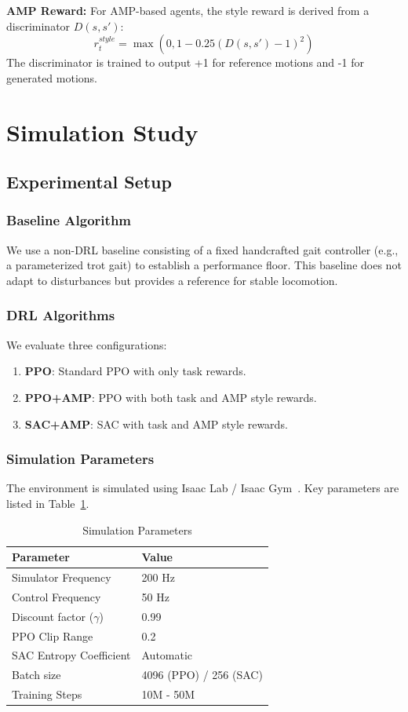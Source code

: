 \documentclass[conference]{IEEEtran}
\begin{document}
\textbf{AMP Reward:}
For AMP-based agents, the style reward is derived from a discriminator $D(s, s')$:
\begin{equation}
    r_t^{style} = \max(0, 1 - 0.25 (D(s, s') - 1)^2)
\end{equation}
The discriminator is trained to output +1 for reference motions and -1 for generated motions.

\section{Simulation Study}

\subsection{Experimental Setup}

\subsubsection{Baseline Algorithm}
We use a non-DRL baseline consisting of a fixed handcrafted gait controller (e.g., a parameterized trot gait) to establish a performance floor. This baseline does not adapt to disturbances but provides a reference for stable locomotion.

\subsubsection{DRL Algorithms}
We evaluate three configurations:
\begin{enumerate}
    \item \textbf{PPO}: Standard PPO with only task rewards.
    \item \textbf{PPO+AMP}: PPO with both task and AMP style rewards.
    \item \textbf{SAC+AMP}: SAC with task and AMP style rewards.
\end{enumerate}

\subsubsection{Simulation Parameters}
The environment is simulated using Isaac Lab / Isaac Gym~\cite{makoviychuk2021isaac}. Key parameters are listed in Table~\ref{tab:sim_params}.

\begin{table}[h]
\centering
\caption{Simulation Parameters}
\label{tab:sim_params}
\begin{tabular}{ll}
\hline
\textbf{Parameter} & \textbf{Value} \\
\hline
Simulator Frequency & 200 Hz \\
Control Frequency & 50 Hz \\
Discount factor ($\gamma$) & 0.99 \\
PPO Clip Range & 0.2 \\
SAC Entropy Coefficient & Automatic \\
Batch size & 4096 (PPO) / 256 (SAC) \\
Training Steps & 10M - 50M \\
\hline
\end{tabular}
\end{table}
\end{document}
